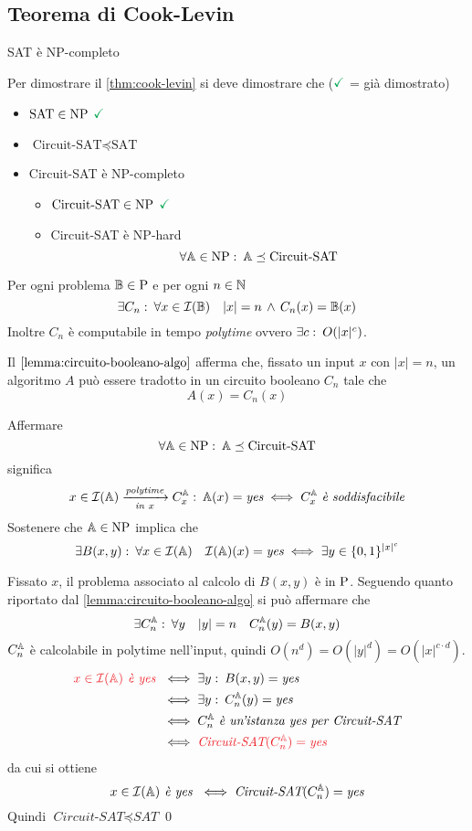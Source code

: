 \subsection{Teorema di Cook-Levin}
\begin{theorem}
	SAT è NP-completo\label{thm:cook-levin}
\end{theorem}
Per dimostrare il \cref{thm:cook-levin} si deve dimostrare che ($\color{Green}\checkmark$ = già dimostrato)
\begin{itemize}
	\item $\text{SAT}\in \text{NP}$ $\color{Green}\checkmark$
	\item $\text{Circuit-SAT}\preceq \text{SAT}$
	\item Circuit-SAT è NP-completo
	\begin{itemize}
		\item $\text{Circuit-SAT}\in\text{NP}$ $\color{Green}\checkmark$
		\item Circuit-SAT è NP-hard \[\forall\mathbb{A}\in\text{NP}\,\colon\,\mathbb{A}\preceq \text{Circuit-SAT}\]
	\end{itemize}
\end{itemize}
\begin{lemma}
	Per ogni problema $\mathbb{B}\in\text{P}$ e per ogni $n\in\mathbb{N}$\[\exists C_n\,\colon\,\forall x\in \mathcal{I}(\mathbb{B})\quad |x|=n \,\wedge\, C_n(x)=\mathbb{B}(x)\]
	Inoltre $C_n$ è computabile in tempo \textit{polytime} ovvero $\exists c\,\colon\, O(|x|^c)$.\label{lemma:circuito-booleano-algo}
\end{lemma}
Il $\cref{lemma:circuito-booleano-algo}$ afferma che, fissato un input $x$ con $|x|=n$, un algoritmo $A$ può essere tradotto in un circuito booleano $C_n$ tale che \[A(x)=C_n(x)\]
\begin{demonstration}
	Affermare \[\forall\mathbb{A}\in\text{NP}\,\colon\,\mathbb{A}\preceq\text{Circuit-SAT}\]
	significa \[x\in\ipb{A}\xrightarrow[\textit{in}\ x]{\polytime}C_x^\pbc{A}\tc\pbc{A}(x)=\yes\iff C_x^\pbc{A}\ \textit{è soddisfacibile}\]
	Sostenere che $\mathbb{A}\in\text{NP}$ implica che
	\[\exists B(x,y)\,\colon\,\forall x\in\mathcal{I}(\mathbb{A})\quad\mathcal{I}(\mathbb{A})(x)=\textit{yes}\iff\exists y\in\{0,1\}^{|x|^c}\]
	
	Fissato $x$, il problema associato al calcolo di $B(x,y)$ 
	è in $\text{P}$. Seguendo quanto riportato dal \cref{lemma:circuito-booleano-algo} si può affermare che \[\exists C_n^{\mathbb{A}}\,\colon\, \forall y\quad |y|=n \quad C_n^{\mathbb{A}}(y)=B(x,y)\] $C_n^{\mathbb{A}}$ è calcolabile in polytime nell'input, quindi $O(n^d)=O(|y|^d)=O(|x|^{c\cdot d})$.
	\begin{align*}
		{\color{Red}x\in\ipb{A}\textit{ è yes }}&\iff \exists y \tc B(x,y)=\yes\\&\iff \exists y \tc C_n^\pbc{A}(y)=\yes\\&\iff C_n^\pbc{A}\ \textit{è un'istanza yes per Circuit-SAT}
		\\&\iff \color{Red}\textit{Circuit-SAT}(C_n^\pbc{A})=\yes
	\end{align*}
	da cui si ottiene \[x\in\mathcal{I}(\mathbb{A})\textit{ è yes }\iff \textit{Circuit-SAT}(C_n^{\mathbb{A}})=\textit{yes}\]
	Quindi $\textit{Circuit-SAT}\preceq \textit{SAT}$\qed
\end{demonstration}

